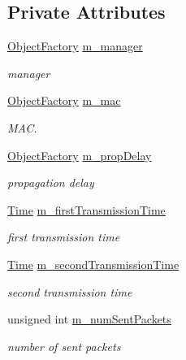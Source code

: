 \subsection*{Private Attributes}
\begin{DoxyCompactItemize}
\item 
\hyperlink{classns3_1_1ObjectFactory}{Object\+Factory} \hyperlink{classDcfImmediateAccessBroadcastTestCase_ab8f20ef6ae6e7c13de2d3e5cb95bc052}{m\+\_\+manager}
\begin{DoxyCompactList}\small\item\em manager \end{DoxyCompactList}\item 
\hyperlink{classns3_1_1ObjectFactory}{Object\+Factory} \hyperlink{classDcfImmediateAccessBroadcastTestCase_ab0a0eb92216037ec211e0fa87ac11d1c}{m\+\_\+mac}
\begin{DoxyCompactList}\small\item\em M\+AC. \end{DoxyCompactList}\item 
\hyperlink{classns3_1_1ObjectFactory}{Object\+Factory} \hyperlink{classDcfImmediateAccessBroadcastTestCase_a6fceb2537384282ce7ee4cdc47d5feef}{m\+\_\+prop\+Delay}
\begin{DoxyCompactList}\small\item\em propagation delay \end{DoxyCompactList}\item 
\hyperlink{classns3_1_1Time}{Time} \hyperlink{classDcfImmediateAccessBroadcastTestCase_a90fe73456a50aa8d866a4488a636da18}{m\+\_\+first\+Transmission\+Time}
\begin{DoxyCompactList}\small\item\em first transmission time \end{DoxyCompactList}\item 
\hyperlink{classns3_1_1Time}{Time} \hyperlink{classDcfImmediateAccessBroadcastTestCase_a89eee6c68fefdc0af43f7b610a3ec686}{m\+\_\+second\+Transmission\+Time}
\begin{DoxyCompactList}\small\item\em second transmission time \end{DoxyCompactList}\item 
unsigned int \hyperlink{classDcfImmediateAccessBroadcastTestCase_a8934bfdda7efae56e84c18a799379780}{m\+\_\+num\+Sent\+Packets}
\begin{DoxyCompactList}\small\item\em number of sent packets \end{DoxyCompactList}\end{DoxyCompactItemize}
